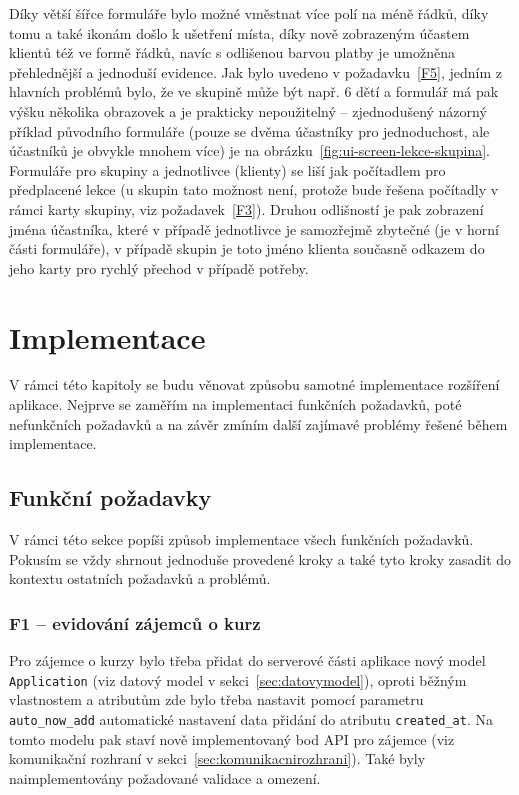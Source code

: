 Díky větší šířce formuláře bylo možné vměstnat více polí na méně řádků, díky tomu a také ikonám došlo k ušetření místa, díky nově zobrazeným účastem klientů též ve formě řádků, navíc s odlišenou barvou platby je umožněna přehlednější a jednoduší evidence. Jak bylo uvedeno v požadavku~\ref{F5}, jedním z hlavních problémů bylo, že ve skupině může být např. 6 dětí a formulář má pak výšku několika obrazovek a je prakticky nepoužitelný -- zjednodušený názorný příklad původního formuláře (pouze se dvěma účastníky pro jednoduchost, ale účastníků je obvykle mnohem více) je na obrázku~\ref{fig:ui-screen-lekce-skupina}. Formuláře pro skupiny a jednotlivce (klienty) se liší jak počítadlem pro předplacené lekce (u skupin tato možnost není, protože bude řešena počítadly v rámci karty skupiny, viz požadavek~\ref{F3}). Druhou odlišností je pak zobrazení jména účastníka, které v případě jednotlivce je samozřejmě zbytečné (je v horní části formuláře), v případě skupin je toto jméno klienta současně odkazem do jeho karty pro rychlý přechod v případě potřeby.

\chapter{Implementace}

V rámci této kapitoly se budu věnovat způsobu samotné implementace rozšíření aplikace. Nejprve se zaměřím na implementaci funkčních požadavků, poté nefunkčních požadavků a na závěr zmíním další zajímavé problémy řešené během implementace.

\section{Funkční požadavky}

V rámci této sekce popíši způsob implementace všech funkčních požadavků. Pokusím se vždy shrnout jednoduše provedené kroky a také tyto kroky zasadit do kontextu ostatních požadavků a problémů.


\subsection{F1 -- evidování zájemců o kurz}

Pro zájemce o kurzy bylo třeba přidat do serverové části aplikace nový model \verb|Application| (viz datový model v sekci~\ref{sec:datovymodel}), oproti běžným vlastnostem a atributům zde bylo třeba nastavit pomocí parametru \verb|auto_now_add| automatické nastavení data přidání do atributu \verb|created_at|. Na tomto modelu pak staví nově implementovaný bod API pro zájemce (viz komunikační rozhraní v sekci~\ref{sec:komunikacnirozhrani}). Také byly naimplementovány požadované validace a omezení.

